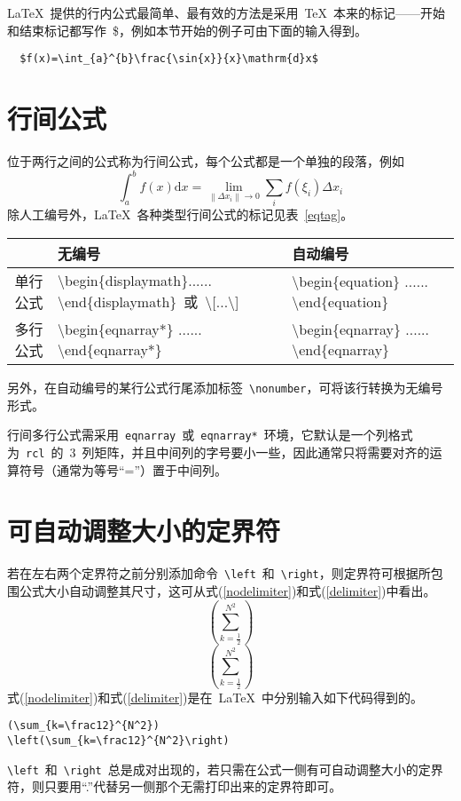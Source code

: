 \LaTeX~提供的行内公式最简单、最有效的方法是采用~\TeX~本来的标记——开始和结束标记都写作~\$，例如本节开始的例子可由下面的输入得到。
\begin{lstlisting}
  $f(x)=\int_{a}^{b}\frac{\sin{x}}{x}\mathrm{d}x$
\end{lstlisting}

\section{行间公式}

位于两行之间的公式称为行间公式，每个公式都是一个单独的段落，例如
\[\int_a^b{f\left(x\right)\mathrm{d}x}=\lim_{\left\|\Delta{x_i}\right\|\to 0}\sum_i{f\left(\xi_i\right)\Delta{x_i}}\]
除人工编号外，\LaTeX~各种类型行间公式的标记见表~\ref{eqtag}。
\begin{table}[htbp]
\vspace{0.5em}\centering\wuhao
\begin{tabularx}{0.9\textwidth}{cXX}
\toprule
& 无编号 & 自动编号\\\midrule
单行公式 & \textbackslash begin\{displaymath\}...... \textbackslash end\{displaymath\}~或~\textbackslash [...\textbackslash ] & \textbackslash begin\{equation\} ...... \textbackslash end\{equation\}\\
多行公式 & \textbackslash begin\{eqnarray*\} ...... \textbackslash end\{eqnarray*\} & \textbackslash begin\{eqnarray\} ...... \textbackslash end\{eqnarray\}\\
\bottomrule
\end{tabularx}
\end{table}
另外，在自动编号的某行公式行尾添加标签~\verb|\nonumber|，可将该行转换为无编号形式。

行间多行公式需采用~\verb|eqnarray|~或~\verb|eqnarray*|~环境，它默认是一个列格式为~\verb|rcl|~的~3~列矩阵，并且中间列的字号要小一些，因此通常只将需要对齐的运算符号（通常为等号“=”）置于中间列。

\section{可自动调整大小的定界符}

若在左右两个定界符之前分别添加命令~\verb|\left|~和~\verb|\right|，则定界符可根据所包围公式大小自动调整其尺寸，这可从式(\ref{nodelimiter})和式(\ref{delimiter})中看出。
\begin{equation}\label{nodelimiter}
(\sum_{k=\frac12}^{N^2})
\end{equation}
\begin{equation}\label{delimiter}
\left(\sum_{k=\frac12}^{N^2}\right)
\end{equation}
式(\ref{nodelimiter})和式(\ref{delimiter})是在~\LaTeX~中分别输入如下代码得到的。
\begin{lstlisting}
(\sum_{k=\frac12}^{N^2})
\left(\sum_{k=\frac12}^{N^2}\right)
\end{lstlisting}
\verb|\left|~和~\verb|\right|~总是成对出现的，若只需在公式一侧有可自动调整大小的定界符，则只要用“.”代替另一侧那个无需打印出来的定界符即可。

